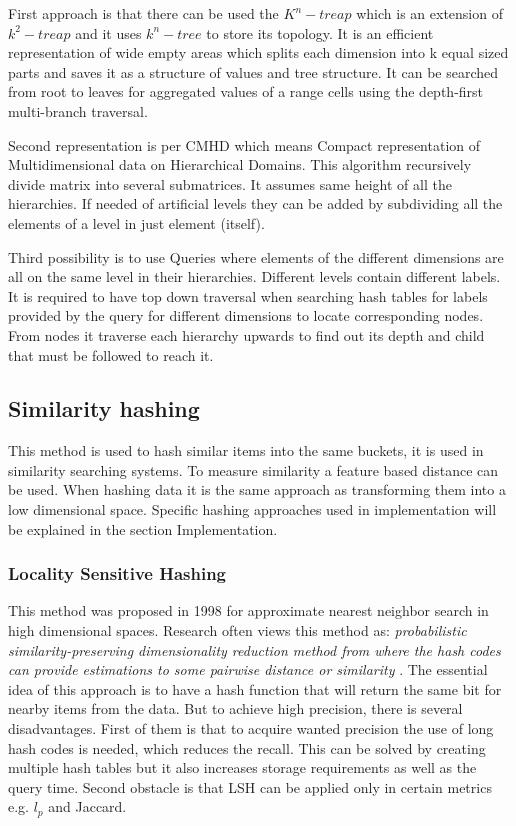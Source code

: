 First approach is that there can be used the $K^n-treap$ which is an extension of $k^2-treap$ and it uses $k^n-tree$ to store its topology. It is an efficient representation of wide empty areas which splits each dimension into k equal sized parts and saves it as a structure of values and tree structure. It can be searched from root to leaves for aggregated values of a range cells using the depth-first multi-branch traversal.

Second representation is per CMHD which means Compact representation of Multidimensional data on Hierarchical Domains. This algorithm recursively divide matrix into several submatrices. It assumes same height of all the hierarchies. If needed of artificial levels they can be added by subdividing all the elements of a level in just element (itself).

Third possibility is to use Queries where elements of the different dimensions are all on the same level in their hierarchies. Different levels contain different labels. It is required to have top down traversal when searching hash tables for labels provided by the query for different dimensions to locate corresponding nodes. From nodes it traverse each hierarchy upwards to find out its depth and child that must be followed to reach it. \cite{efficientRepre}
\subsection{Similarity hashing}
This method is used to hash similar items into the same buckets, it is used in similarity searching systems. To measure similarity a feature based distance can be used. When hashing data it is the same approach as transforming them into a low dimensional space. Specific hashing approaches used in implementation will be explained in the section Implementation.

\subsubsection{Locality Sensitive Hashing}
This method was proposed in 1998 for approximate nearest neighbor search in high dimensional spaces. Research often views this method as: \textit{probabilistic similarity-preserving dimensionality reduction method from where the hash codes can provide estimations to some pairwise distance or similarity}  \cite{hashing}. The essential idea of this approach is to have a hash function that will return the same bit for nearby items from the data. But to achieve high precision, there is several disadvantages. First of them is that to acquire wanted precision the use of long hash codes is needed, which reduces the recall. This can be solved by creating multiple hash tables but it also increases storage requirements as well as the query time. Second obstacle is that LSH can be applied only in certain metrics e.g. $l_p$ and Jaccard. 

